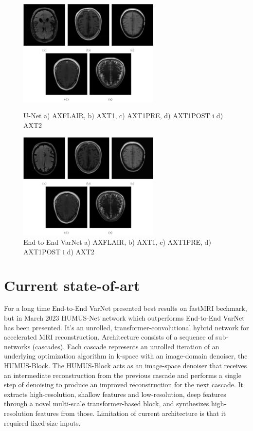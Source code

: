 \documentclass[10pt,a4paper]{article}
\begin{document}
\begin{figure}[H]
\begin{minipage}{.45\textwidth}
  \centering
  \includegraphics[width=200pt]{./images/unet-images.png}
  \caption{U-Net a) AXFLAIR, b) AXT1, c) AXT1PRE, d) AXT1POST i d) AXT2}
\end{minipage}%
\hspace{20pt} %
\begin{minipage}{.45\textwidth}
  \centering
  \includegraphics[width=200pt]{./images/varnet-images.png}
  \caption{End-to-End VarNet a) AXFLAIR, b) AXT1, c) AXT1PRE, d) AXT1POST i d) AXT2}
\end{minipage}
\end{figure}

\newpage

\section{Current state-of-art}

For a long time End-to-End VarNet presented best results on fastMRI bechmark, but in March 2023 HUMUS-Net network which outperforms End-to-End VarNet has been presented. It's an unrolled, transformer-convolutional hybrid network for accelerated MRI reconstruction. Architecture consists of a sequence of sub-networks (cascades). Each cascade represents an unrolled iteration of an underlying optimization algorithm in k-space with an image-domain denoiser, the HUMUS-Block. The HUMUS-Block acts as an image-space denoiser that receives an intermediate reconstruction from the previous cascade and performs a single step of denoising to produce an improved reconstruction for the next cascade. It extracts high-resolution, shallow features and low-resolution, deep features through a novel multi-scale transformer-based block, and synthesizes high-resolution features from those. Limitation of current architecture is that it required fixed-size inputs. \cite{fabian2023humusnet}
\end{document}
